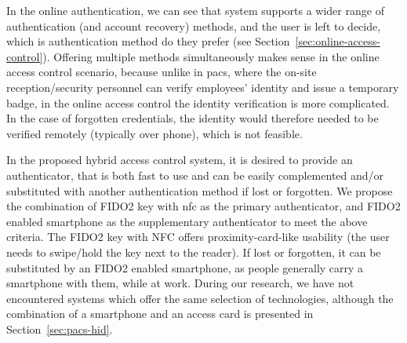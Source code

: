 In the online authentication, we can see that system supports a wider range of authentication (and account recovery) methods, and the user is left to decide, which is authentication method do they prefer (see Section~\ref{sec:online-access-control}). Offering multiple methods simultaneously makes sense in the online access control scenario, because unlike in \acrshort{pacs}, where the on-site reception/security personnel can verify employees' identity and issue a temporary badge, in the online access control the identity verification is more complicated. In the case of forgotten credentials, the identity would therefore needed to be verified remotely (typically over phone), which is not feasible.

In the proposed hybrid access control system, it is desired to provide an authenticator, that is both fast to use and can be easily complemented and/or substituted with another authentication method if lost or forgotten. We propose the combination of FIDO2 key with \acrshort{nfc} as the primary authenticator, and FIDO2 enabled smartphone as the supplementary authenticator to meet the above criteria. The FIDO2 key with NFC offers proximity-card-like usability (the user needs to swipe/hold the key next to the reader). If lost or forgotten, it can be substituted by an FIDO2 enabled smartphone, as people generally carry a smartphone with them, while at work. During our research, we have not encountered systems which offer the same selection of technologies, although the combination of a smartphone and an access card is presented in Section~\ref{sec:pacs-hid}.




